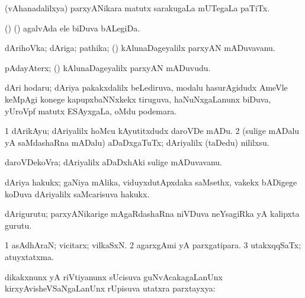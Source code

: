 {\bentry
{} 
\gl{\uparx}
\expl{}
\bmng
{} 
\emng
\eentry

\bentry
{} 
\gl{\nA}
\expl{}
\bmng
(vAhanadalilxya) parxyANikara matutx sarakugaLa mUTegaLa paTiTx. 
\emng
\eentry

\bentry
{} 
\gl{\nA}
\expl{}
\bmng
(\birx) (\pArxparx) agalvAda ele biDuva bALegiDa. 
\emng
\eentry

\bentry
{} 
\gl{\nA}
\expl{}
\bmng
dArihoVka; dAriga; pathika; (\kanmu) kAlunaDageyalilx parxyAN mADuvavanu. 
\emng
\eentry

\bentry
{} 
\gl{\nA}
\expl{}
\bmng
pAdayAterx; (\kanmu) kAlunaDageyalilx parxyAN mADuvudu. 
\emng
\eentry

\bentry
{} 
\gl{\nA}
\expl{}
\bmng
dAri hodaru; dAriya pakakxdalilx beLediruva, modalu hasurAgidudx AmeVle keMpAgi konege kapupxbaNNxkekx tiruguva, haNuNxgaLanunx biDuva, yUroVpf matutx ESAyxgaLa, oMdu podemara. 
\emng
\eentry

\bentry
{} 
\gl{\sakirx}
\bmng
\bnum
\num{1} dArikAyu; dAriyalilx hoMcu kAyutitxdudx daroVDe mADu. 
\num{2} (sulige mADalu yA saMdashaRna mADalu) aDaDxgaTuTx; dAriyalilx (taDedu) nililxsu. 
\enum
\emng
\eentry

\bentry
{} 
\gl{\nA}
\expl{}
\bmng
daroVDekoVra; dAriyalilx aDaDxhAki sulige mADuvavanu. 
\emng
\eentry

\bentry
{} 
\gl{\nA}
\expl{}
\bmng
dAriya hakukx; gaNiya mAlika, viduyxdutApxdaka saMsethx, \mo vakekx bADigege koDuva dAriyalilx saMcarisuva hakukx. 
\emng
\eentry

\bentry
{} 
\gl{\nA}
\expl{}
\bmng
dArigurutu; parxyANikarige mAgaRdashaRna niVDuva neYsagiRka yA kalipxta gurutu. 
\emng
\eentry

\bentry
{} 
\gl{\gu}
\expl{}
\bmng
\bnum
\num{1} asAdhAraN; vicitarx; vilkaSxN. 
\num{2} agarxgAmi yA parxgatipara. 
\num{3} utakxqqSaTx; atuyxtatxma. 
\enum
\emng
\eentry

\bentry
{} 
\gl{\uparx}
\expl{}
\bmng
dikakxnunx yA riVtiyanunx sUcisuva guNvAcakagaLanUnx kirxyAvisheVSaNgaLanUnx rUpisuva utatxra parxtayxya:  
\emng
\eentry

}
